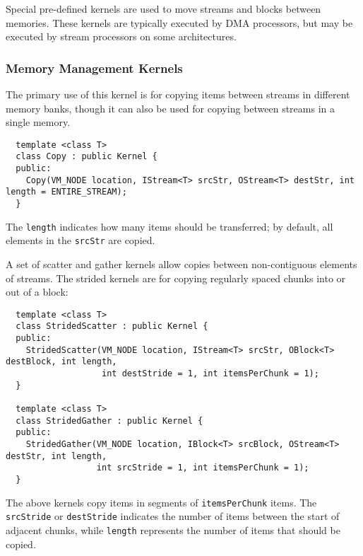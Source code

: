\label{sec:predef}

Special pre-defined kernels are used to move streams and blocks between memories.
These kernels are typically executed by DMA processors, but may be executed by
stream processors on some architectures.

\subsubsection*{Memory Management Kernels}

 The primary use of this kernel is for copying items
between streams in different memory banks, though it can also be used
for copying between streams in a single memory.
{\small
\begin{verbatim}
  template <class T>
  class Copy : public Kernel {
  public:
    Copy(VM_NODE location, IStream<T> srcStr, OStream<T> destStr, int length = ENTIRE_STREAM);
  }
\end{verbatim}}
The {\tt length} indicates how many items should be transferred; by
default, all elements in the {\tt srcStr} are copied.

 A set of scatter and gather kernels allow copies
between non-contiguous elements of streams.  The strided kernels are
for copying regularly spaced chunks into or out of a block:
{\small
\begin{verbatim}
  template <class T>
  class StridedScatter : public Kernel {
  public:
    StridedScatter(VM_NODE location, IStream<T> srcStr, OBlock<T> destBlock, int length,
                   int destStride = 1, int itemsPerChunk = 1);
  }

  template <class T>
  class StridedGather : public Kernel {
  public:
    StridedGather(VM_NODE location, IBlock<T> srcBlock, OStream<T> destStr, int length,
                  int srcStride = 1, int itemsPerChunk = 1);
  }  
\end{verbatim}}
The above kernels copy items in segments of {\tt itemsPerChunk} items.
The {\tt srcStride} or {\tt destStride} indicates the number of items
between the start of adjacent chunks, while {\tt length} represents
the number of items that should be copied.

